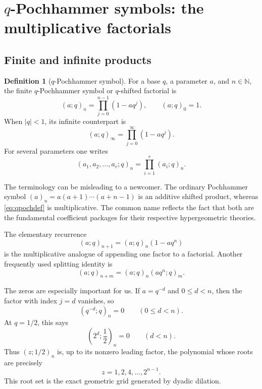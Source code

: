 \documentclass[11pt,oneside]{article}
\theoremstyle{definition}
\newtheorem{definition}[theorem]{Definition}
\theoremstyle{remark}
\newcommand{\qpoch}[3]{\left(#1;#2\right)_{#3}}
\newcommand{\N}{\mathbb N}
\begin{document}
\section{\texorpdfstring{$q$-Pochhammer symbols}{q-Pochhammer symbols}: the multiplicative factorials}

\subsection{Finite and infinite products}

\begin{definition}[$q$-Pochhammer symbol]
For a base $q$, a parameter $a$, and $n\in\N$, the finite $q$-Pochhammer symbol or $q$-shifted factorial is
\begin{equation}\label{eq:qpochdef}
  \qpoch{a}{q}{n}=\prod_{j=0}^{n-1}(1-aq^j),
  \qquad \qpoch{a}{q}{0}=1.
\end{equation}
When $|q|<1$, its infinite counterpart is
\begin{equation}\label{eq:qpochinf}
  \qpoch{a}{q}{\infty}=\prod_{j=0}^{\infty}(1-aq^j).
\end{equation}
For several parameters one writes
\[
  \qpoch{a_1,a_2,\ldots,a_r}{q}{n}
   =\prod_{i=1}^{r}\qpoch{a_i}{q}{n}.
\]
\end{definition}

The terminology can be misleading to a newcomer.  The ordinary Pochhammer symbol $(a)_n=a(a+1)\cdots(a+n-1)$ is an additive shifted product, whereas \eqref{eq:qpochdef} is multiplicative.  The common name reflects the fact that both are the fundamental coefficient packages for their respective hypergeometric theories.

The elementary recurrence
\begin{equation}\label{eq:qpochrec}
 \qpoch{a}{q}{n+1}=\qpoch{a}{q}{n}(1-aq^n)
\end{equation}
is the multiplicative analogue of appending one factor to a factorial.  Another frequently used splitting identity is
\begin{equation}\label{eq:qpochsplit}
 \qpoch{a}{q}{n+m}=\qpoch{a}{q}{n}\qpoch{aq^n}{q}{m}.
\end{equation}

The zeros are especially important for us.  If $a=q^{-d}$ and $0\le d<n$, then the factor with index $j=d$ vanishes, so
\begin{equation}\label{eq:qpochzero}
 \qpoch{q^{-d}}{q}{n}=0\qquad(0\le d<n).
\end{equation}
At $q=1/2$, this says
\begin{equation}\label{eq:halfzeros}
 \qpoch{2^d}{\frac12}{n}=0\qquad(d<n).
\end{equation}
Thus $\qpoch{z}{1/2}{n}$ is, up to its nonzero leading factor, the polynomial whose roots are precisely
\[
  z=1,2,4,\ldots,2^{n-1}.
\]
This root set is the exact geometric grid generated by dyadic dilation.
\end{document}
